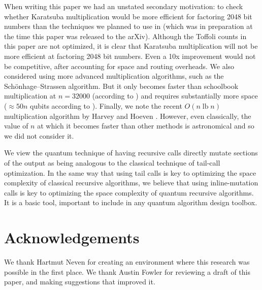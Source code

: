 \documentclass[onecolumn,unpublished]{quantumarticle}
\def\lb{\operatorname{lb}}
\begin{document}
When writing this paper we had an unstated secondary motivation: to check whether Karatsuba multiplication would be more efficient for factoring 2048 bit numbers than the techniques we planned to use in \cite{gidney2019factor} (which was in preparation at the time this paper was released to the arXiv).
Although the Toffoli counts in this paper are not optimized, it is clear that Karatsuba multiplication will not be more efficient at factoring 2048 bit numbers.
Even a 10x improvement would not be competitive, after accounting for space and routing overheads.
We also considered using more advanced multiplication algorithms, such as the Schönhage–Strassen algorithm.
But it only becomes faster than schoolbook multiplication at $n=32000$ (according to \cite{van2005fast}) and requires substantially more space ($\approx 50n$ qubits according to \cite{zalka1998fast}).
Finally, we note the recent $O(n \lb n)$ multiplication algorithm by Harvey and Hoeven \cite{harvey2019integer}.
However, even classically, the value of $n$ at which it becomes faster than other methods is astronomical and so we did not consider it.

We view the quantum technique of having recursive calls directly mutate sections of the output as being analogous to the classical technique of tail-call optimization.
In the same way that using tail calls is key to optimizing the space complexity of classical recursive algorithms, we believe that using inline-mutation calls is key to optimizing the space complexity of quantum recursive algorithms.
It is a basic tool, important to include in any quantum algorithm design toolbox.


\section{Acknowledgements}

We thank Hartmut Neven for creating an environment where this research was possible in the first place.
We thank Austin Fowler for reviewing a draft of this paper, and making suggestions that improved it.





\appendix
\end{document}
